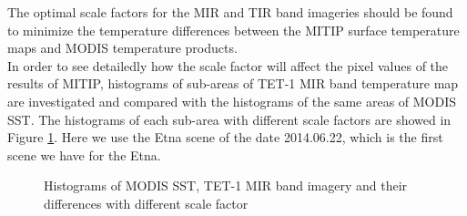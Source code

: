 \noindent The optimal scale factors for the MIR and TIR band imageries should be found to minimize the temperature differences between the MITIP surface temperature maps and MODIS temperature products.\\

\noindent In order to see detailedly how the scale factor will affect the pixel values of the results of MITIP, histograms of sub-areas of TET-1 MIR band temperature map are investigated and compared with the histograms of the same areas of MODIS SST. The histograms of each sub-area with different scale factors are showed in Figure \ref{fig:hist_rect_all}. Here we use the Etna scene of the date 2014.06.22, which is the first scene we have for the Etna.\\

\begin{figure}[!htbp]
\centering
{}
\vspace{0.1in}

\hspace{0.5in}

\vspace{0.1in}

\hspace{0.5in}

\vspace{0.1in}

\hspace{0.5in}

\vspace{0.1in}

\caption{Histograms of MODIS SST, TET-1 MIR band imagery and their differences with different scale factor}
\label{fig:hist_rect_all}
\end{figure}

